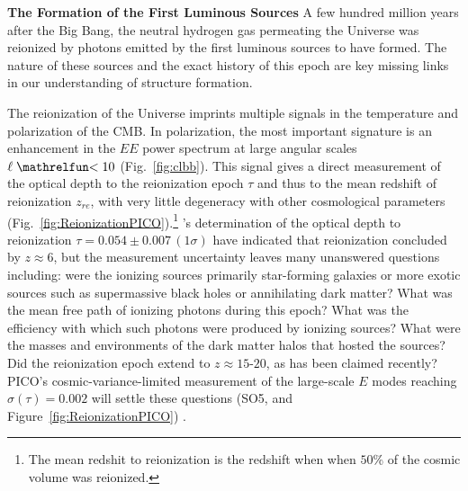 \documentclass[PICOReport.tex]{subfiles}
\begin{document}

{\bf The Formation of the First Luminous Sources} \hspace{0.1in} \label{luminoussources}  
A few hundred million years after the Big Bang, the neutral hydrogen gas permeating the Universe was reionized by photons emitted by the first luminous sources to have formed.  The nature of these sources and the exact history of this epoch are key missing links in our understanding of structure formation.  
% 

The reionization of the Universe imprints multiple signals in the temperature and polarization of the CMB.  In polarization, the most important signature is an enhancement in the $EE$ power spectrum at large angular scales $\ell \simlt 10$ (Fig.~\ref{fig:clbb}). This signal gives a direct measurement of the optical depth to the reionization epoch $\tau$ and thus to the mean redshift of reionization $z_{re}$, with very little degeneracy with other cosmological parameters (Fig.~\ref{fig:ReionizationPICO}).\footnote{The mean redshit to reionization is the redshift when when $50$\% of the cosmic volume was reionized.} \planck 's determination of the optical depth to reionization $\tau = 0.054 \pm 0.007\, (1\sigma) $ have indicated that reionization concluded by $z \approx 6$, but the measurement uncertainty leaves many unanswered questions including: were the ionizing sources primarily star-forming galaxies or more exotic sources such as supermassive black holes or annihilating dark matter? What was the mean free path of ionizing photons during this epoch?  What was the efficiency with which such photons were produced by ionizing sources?  What were the masses and environments of the dark matter halos that hosted the sources?  Did the 
reionization epoch extend to $z \approx 15$-$20$, as has been claimed recently?~\citep{Miranda2017}
PICO's cosmic-variance-limited measurement of the large-scale $E$ modes reaching $\sigma(\tau)=0.002$ will settle these questions (SO5, and Figure~\ref{fig:ReionizationPICO}) . 
\end{document}
